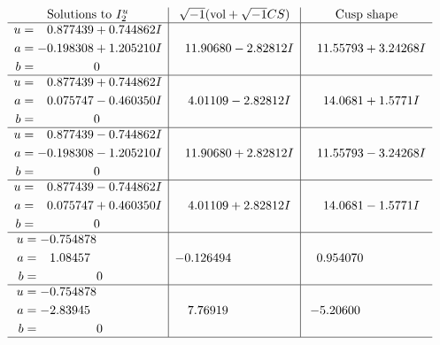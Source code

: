 \documentclass[1p]{elsarticle_modified}
\theoremstyle{definition}
\newcommand{\I}{\sqrt{-1}}
\begin{document}
$$\begin{array}{c|c|c}  
\text{Solutions to }I^u_{2}& \I (\text{vol} + \sqrt{-1}CS) & \text{Cusp shape}\\
 \hline 
\begin{aligned}
u &= \phantom{-}0.877439 + 0.744862 I \\
a &= -0.198308 + 1.205210 I \\
b &= \phantom{-0.000000 } 0\end{aligned}
 & \phantom{-}11.90680 - 2.82812 I & \phantom{-}11.55793 + 3.24268 I \\ \hline\begin{aligned}
u &= \phantom{-}0.877439 + 0.744862 I \\
a &= \phantom{-}0.075747 - 0.460350 I \\
b &= \phantom{-0.000000 } 0\end{aligned}
 & \phantom{-}4.01109 - 2.82812 I & \phantom{-}14.0681 + 1.5771 I \\ \hline\begin{aligned}
u &= \phantom{-}0.877439 - 0.744862 I \\
a &= -0.198308 - 1.205210 I \\
b &= \phantom{-0.000000 } 0\end{aligned}
 & \phantom{-}11.90680 + 2.82812 I & \phantom{-}11.55793 - 3.24268 I \\ \hline\begin{aligned}
u &= \phantom{-}0.877439 - 0.744862 I \\
a &= \phantom{-}0.075747 + 0.460350 I \\
b &= \phantom{-0.000000 } 0\end{aligned}
 & \phantom{-}4.01109 + 2.82812 I & \phantom{-}14.0681 - 1.5771 I \\ \hline\begin{aligned}
u &= -0.754878\phantom{ +0.000000I} \\
a &= \phantom{-}1.08457\phantom{ +0.000000I} \\
b &= \phantom{-0.000000 } 0\end{aligned}
 & -0.126494\phantom{ +0.000000I} & \phantom{-}0.954070\phantom{ +0.000000I} \\ \hline\begin{aligned}
u &= -0.754878\phantom{ +0.000000I} \\
a &= -2.83945\phantom{ +0.000000I} \\
b &= \phantom{-0.000000 } 0\end{aligned}
 & \phantom{-}7.76919\phantom{ +0.000000I} & -5.20600\phantom{ +0.000000I}\\
 \hline 
 \end{array}$$\newpage
\end{document}
